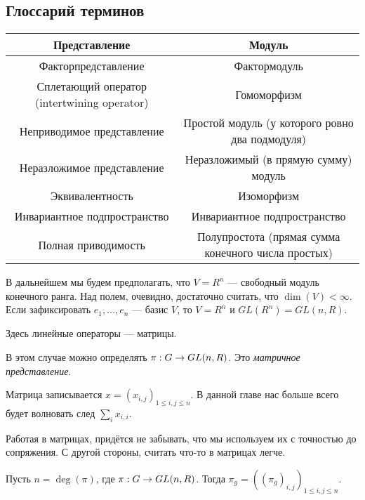\subsection{Глоссарий терминов}
\begin{tabular}{|c|c|}
    \hline
    Представление                               & Модуль                                              \\\hline
    Факторпредставление                         & Фактормодуль                                        \\\hline
    Сплетающий оператор (intertwining operator) & Гомоморфизм                                         \\\hline
    Неприводимое представление                  & Простой модуль (у которого ровно два подмодуля)     \\\hline
    Неразложимое представление                  & Неразложимый (в прямую сумму) модуль                \\\hline
    Эквивалентность                             & Изоморфизм                                          \\\hline
    Инвариантное подпространство                & Инвариантное подпространство                        \\\hline
    Полная приводимость                         & Полупростота (прямая сумма конечного числа простых) \\\hline
\end{tabular}

В дальнейшем мы будем предполагать, что $V = R^n$ --- свободный модуль конечного ранга.
Над полем, очевидно, достаточно считать, что $\dim(V) < \infty$.
Если зафиксировать $e_1, \dots, e_n$ --- базис $V$, то $V = R^n$ и $GL(R^n) = GL(n, R)$.

Здесь линейные операторы --- матрицы.

В этом случае можно определять $\pi: G \rightarrow GL(n, R)$.
Это \emph{матричное представление}.

\ok
Матрица записывается $x = (x_{i,j})_{1 \le i,j \le n}$.
В данной главе нас больше всего будет волновать след $\sum\limits_{i}x_{i,i}$.

Работая в матрицах, придётся не забывать, что мы используем их с точностью до сопряжения.
С другой стороны, считать что-то в матрицах легче.

Пусть $n = \deg(\pi)$, где $\pi: G \rightarrow GL(n, R)$.
Тогда $\pi_g = ((\pi_g)_{i,j})_{1 \le i,j \le n}$.


